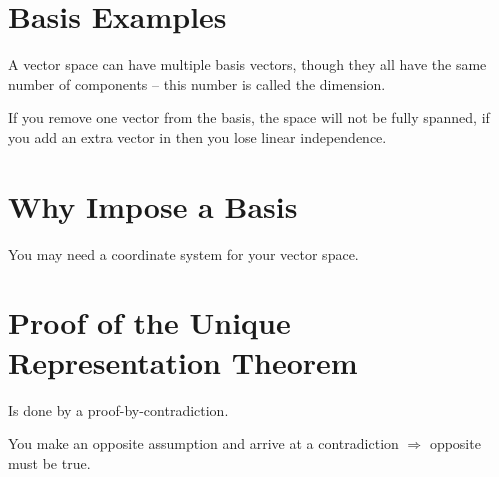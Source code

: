 \documentclass{article}
\begin{document}
\section{Basis Examples} 
A vector space can have multiple basis vectors, though they all have the same
number of components -- this number is called the dimension.

If you remove one vector from the basis, the space will not be fully spanned, if
you add an extra vector in then you lose linear independence.

\section{Why Impose a Basis} 
You may need a coordinate system for your vector space.

\section{Proof of the Unique Representation Theorem} 
Is done by a proof-by-contradiction.

You make an opposite assumption and arrive at a contradiction $ \Rightarrow  $
opposite must be true.

\end{document}
